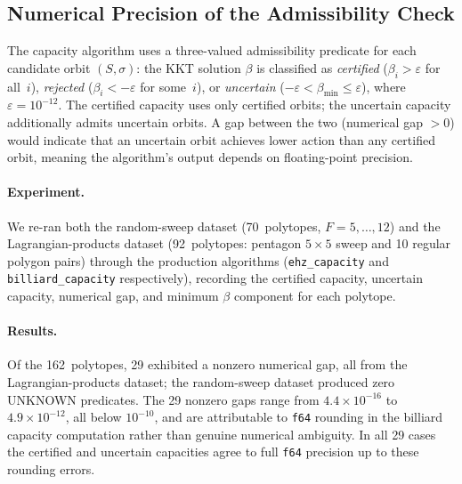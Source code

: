 %
%

\subsection{Numerical Precision of the Admissibility Check}
\label{sec:unknown-predicates}

The capacity algorithm uses a three-valued admissibility predicate for each
candidate orbit $(S, \sigma)$: the KKT solution $\beta$ is classified as
\emph{certified} ($\beta_i > \varepsilon$ for all~$i$),
\emph{rejected} ($\beta_i < -\varepsilon$ for some~$i$), or
\emph{uncertain} ($-\varepsilon < \beta_{\min} \le \varepsilon$),
where $\varepsilon = 10^{-12}$.
The certified capacity uses only certified orbits; the uncertain capacity
additionally admits uncertain orbits.
A gap between the two (numerical gap $> 0$) would indicate that an
uncertain orbit achieves lower action than any certified orbit, meaning
the algorithm's output depends on floating-point precision.

\paragraph{Experiment.}
We re-ran both the random-sweep dataset (70~polytopes, $F = 5, \ldots, 12$)
and the Lagrangian-products dataset (92~polytopes: pentagon $5 \times 5$ sweep
and 10 regular polygon pairs) through the production algorithms
(\texttt{ehz\_capacity} and \texttt{billiard\_capacity} respectively),
recording the certified capacity, uncertain capacity, numerical gap,
and minimum $\beta$ component for each polytope.

\paragraph{Results.}
Of the 162~polytopes, 29 exhibited a nonzero numerical gap, all from the
Lagrangian-products dataset; the random-sweep dataset produced zero
UNKNOWN predicates.
The 29 nonzero gaps range from $4.4 \times 10^{-16}$ to $4.9 \times 10^{-12}$,
all below $10^{-10}$, and are attributable to \texttt{f64} rounding in the
billiard capacity computation rather than genuine numerical ambiguity.
In all 29 cases the certified and uncertain capacities agree to full
\texttt{f64} precision up to these rounding errors.

